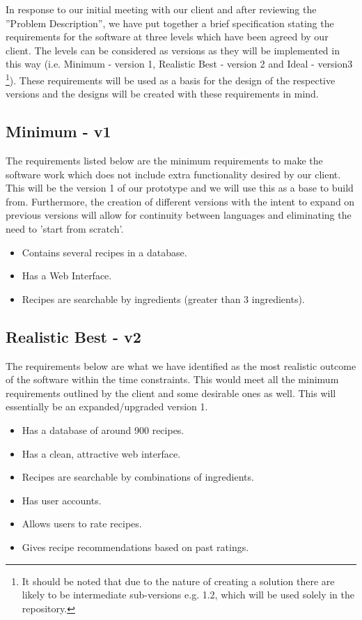 In response to our initial meeting with our client and after reviewing the ''Problem Description'', we have put together a brief specification stating the requirements for the software at three levels which have been agreed by our client. The levels can be considered as versions as they will be implemented in this way (i.e. Minimum - version 1, Realistic Best -  version 2 and Ideal - version3 \footnote{It should be noted that due to the nature of creating a solution there are likely to be intermediate sub-versions e.g. 1.2, which will be used solely in the repository.}). These requirements will be used as a basis for the design of the respective versions and the designs will be created with these requirements in mind.

\subsection{Minimum - v1}

The requirements listed below are the minimum requirements to make the software work which does not include extra functionality desired by our client. This will be the version 1 of our prototype and we will use this as a base to build from. 
Furthermore, the creation of different versions with the intent to expand on previous versions will allow for continuity between languages and eliminating the need to 'start from scratch'.

\begin{itemize}
	\item Contains several recipes in a database.
	\item Has a Web Interface.
	\item Recipes are searchable by ingredients (greater than 3 ingredients).

\end{itemize}

\subsection{Realistic Best - v2}

The requirements below are what we have identified as the most realistic outcome of the software within the time constraints. This would meet all the minimum requirements outlined by the client and some desirable ones as well. This will essentially be an expanded/upgraded version 1.

\begin{itemize}
	\item Has a database of around 900 recipes. 
	\item Has a clean, attractive web interface.
	\item Recipes are searchable by combinations of ingredients.
	\item Has user accounts.
	\item Allows users to rate recipes.
	\item Gives recipe recommendations based on past ratings.
\end{itemize}

